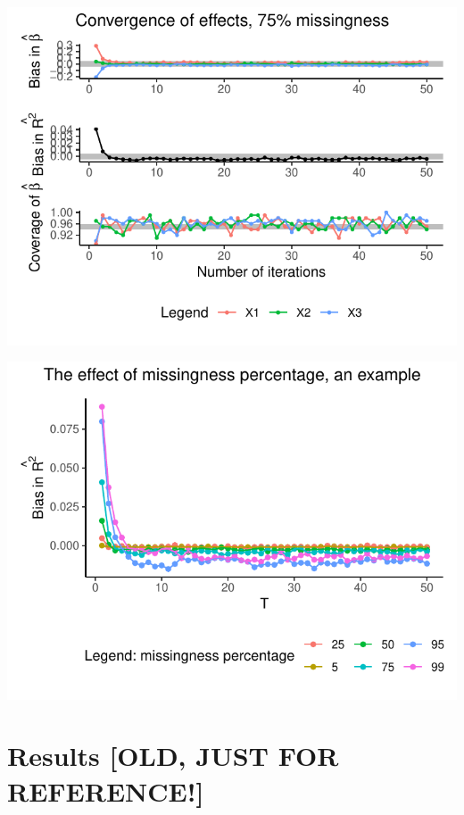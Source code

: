 \documentclass[Royal,times,sageh]{sagej}
\begin{document}
\begin{flushleft}\includegraphics{manuscript_files/figure-latex/unnamed-chunk-5-1} \end{flushleft}

\begin{flushleft}\includegraphics{manuscript_files/figure-latex/unnamed-chunk-6-1} \end{flushleft}

\hypertarget{results-old-just-for-reference}{%
\section{Results {[}OLD, JUST FOR
REFERENCE!{]}}\label{results-old-just-for-reference}}
\end{document}
